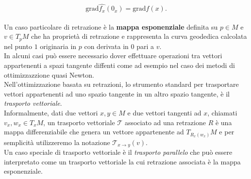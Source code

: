 \documentclass[a4paper, 12pt]{article}
\begin{document}
\[ \mbox{grad} \hat{f_x}(0_x) = \mbox{grad} f(x).\]\\
Un caso particolare di retrazione è la \textbf{mappa esponenziale} definita su $p \in M$ e $v \in T_pM$ che ha proprietà di retrazione e rappresenta la curva geodedica calcolata nel punto $1$ originaria in $p$ con derivata in $0$ pari a $v$.\\
In alcuni casi può essere necessario dover effettuare operazioni tra vettori appartenenti a spazi tangente diffenti come ad esempio nel caso dei metodi di ottimizzazzione quasi Newton.\\ Nell'ottimizzazione basata su retrazioni, lo strumento standard per trasportare vettori appartenenti ad uno spazio tangente in un altro spazio tangente, è il \textit{trasporto vettoriale}.\\
Informalmente, dati due vettori $x, y \in M$ e due vettori tangenti ad $x$, chiamati $v_x, w_x \in T_xM$, un trasporto vettoriale $\mathcal{T}$ associato ad una retrazione $R$ è una mappa differenziabile che genera un vettore appartenente ad $T_{R_x(w_x)}M$ e per semplicità utilizzeremo la notazione $\mathcal{T}_{x \to y}(v)$.\\
Un caso speciale di trasporto vettoriale è il \textit{trasporto parallelo} che può essere interpretato come un trasporto vettoriale la cui retrazione associata è la mappa esponenziale.
\end{document}
